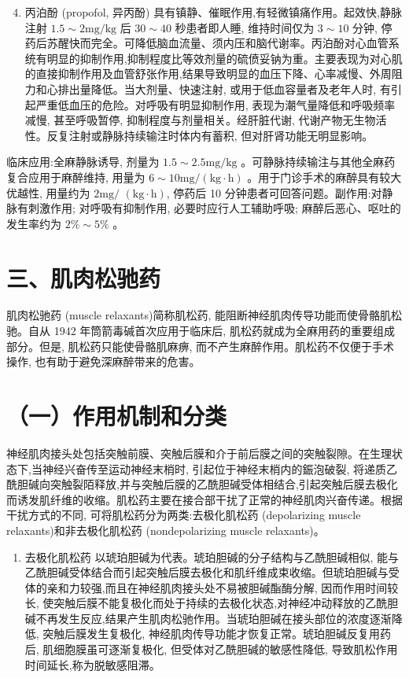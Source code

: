 \documentclass[10pt]{article}
\begin{document}
\begin{enumerate}
  \setcounter{enumi}{3}
  \item 丙泊酚 (propofol, 异丙酚) 具有镇静、催眠作用,有轻微镇痛作用。起效快,静脉注射 $1.5 \sim 2 \mathrm{mg} / \mathrm{kg}$ 后 $30 \sim 40$ 秒患者即人睡, 维持时间仅为 $3 \sim 10$ 分钟, 停药后苏醒快而完全。可降低脑血流量、须内压和脑代谢率。丙泊酚对心血管系统有明显的抑制作用,抑制程度比等效剂量的硫偾妥钠为重。主要表现为对心肌的直接抑制作用及血管舒张作用,结果导致明显的血压下降、心率减慢、外周阻力和心排出量降低。当大剂量、快速注射, 或用于低血容量者及老年人时, 有引起严重低血压的危险。对呼吸有明显抑制作用, 表现为潮气量降低和呼吸频率减慢, 甚至呼吸暂停, 抑制程度与剂量相关。经肝脏代谢, 代谢产物无生物活性。反复注射或静脉持续输注时体内有蓄积, 但对肝肾功能无明显影响。
\end{enumerate}

临床应用:全麻静脉诱导, 剂量为 $1.5 \sim 2.5 \mathrm{mg} / \mathrm{kg}$ 。可静脉持续输注与其他全麻药复合应用于麻醉维持, 用量为 $6 \sim 10 \mathrm{mg} /(\mathrm{kg} \cdot \mathrm{h})$ 。用于门诊手术的麻醉具有较大优越性, 用量约为 $2 \mathrm{mg} /$ $(\mathrm{kg} \cdot \mathrm{h})$, 停药后 10 分钟患者可回答问题。副作用:对静脉有刺激作用; 对呼吸有抑制作用, 必要时应行人工辅助呼吸; 麻醉后恶心、呕吐的发生率约为 $2 \% \sim 5 \%$ 。

\section*{三、肌肉松驰药}
肌肉松驰药 (muscle relaxants)简称肌松药, 能阻断神经肌肉传导功能而使骨骼肌松驰。自从 1942 年筒箭毒碱首次应用于临床后, 肌松药就成为全麻用药的重要组成部分。但是, 肌松药只能使骨骼肌麻痹, 而不产生麻醉作用。肌松药不仅便于手术操作, 也有助于避免深麻醉带来的危害。

\section*{（一）作用机制和分类}
神经肌肉接头处包括突触前膜、突触后膜和介于前后膜之间的突触裂隙。在生理状态下,当神经兴奋传至运动神经末梢时, 引起位于神经末梢内的鋠泡破裂, 将递质乙酰胆碱向突触裂陌释放,并与突触后膜的乙酰胆碱受体相结合,引起突触后膜去极化而诱发肌纤维的收缩。肌松药主要在接合部干扰了正常的神经肌肉兴奋传递。根据干扰方式的不同, 可将肌松药分为两类:去极化肌松药 (depolarizing muscle relaxants)和非去极化肌松药 (nondepolarizing muscle relaxants)。

\begin{enumerate}
  \item 去极化肌松药 以琥珀胆碱为代表。琥珀胆碱的分子结构与乙酰胆碱相似, 能与乙酰胆碱受体结合而引起突触后膜去极化和肌纤维成束收缩。但琥珀胆碱与受体的亲和力较强,而且在神经肌肉接头处不易被胆碱酯酶分解, 因而作用时间较长, 使突触后膜不能复极化而处于持续的去极化状态,对神经冲动释放的乙酰胆碱不再发生反应,结果产生肌肉松驰作用。当琥珀胆碱在接头部位的浓度逐渐降低, 突触后膜发生复极化, 神经肌肉传导功能才恢复正常。琥珀胆碱反复用药后, 肌细胞膜虽可逐渐复极化, 但受体对乙酰胆碱的敏感性降低, 导致肌松作用时间延长,称为脱敏感阻滞。
\end{enumerate}
\end{document}
